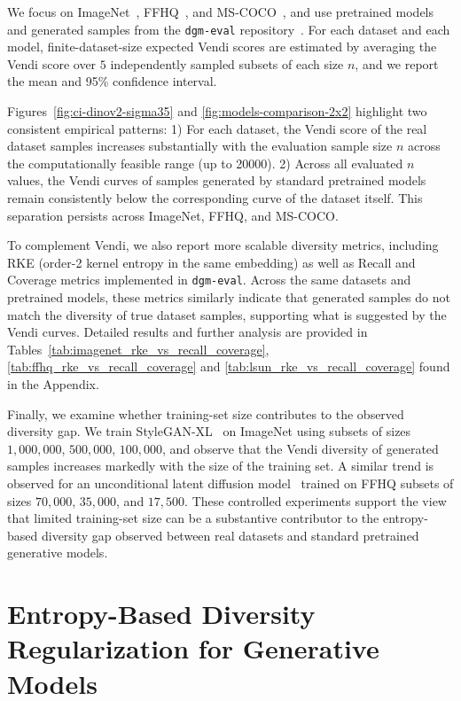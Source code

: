 \documentclass{article}
\theoremstyle{plain}
\theoremstyle{definition}
\begin{document}
We focus on ImageNet~\citep{deng2009imagenet}, FFHQ~\citep{karras2019style}, and MS-COCO~\citep{lin2014coco}, and use pretrained models and generated samples from the \texttt{dgm-eval} repository~\citep{stein_exposing_2023}.
For each dataset and each model, finite-dataset-size expected Vendi scores are estimated by averaging the Vendi score over $5$ independently sampled subsets of each size $n$, and we report the mean and 95\% confidence interval.\vspace{1mm}

Figures~\ref{fig:ci-dinov2-sigma35} and \ref{fig:models-comparison-2x2} highlight two consistent empirical patterns: 1)
For each dataset, the Vendi score of the real dataset samples increases substantially with the evaluation sample size $n$ across the computationally feasible range (up to 20000). 2) Across all evaluated $n$ values, the Vendi curves of samples generated by standard pretrained models remain consistently below the corresponding curve of the dataset itself.
This separation persists across ImageNet, FFHQ, and MS-COCO.

To complement Vendi, we also report more scalable diversity metrics, including RKE (order-2 kernel entropy in the same embedding) as well as Recall and Coverage metrics implemented in \texttt{dgm-eval}.
Across the same datasets and pretrained models, these metrics similarly indicate that generated samples do not match the diversity of true dataset samples, supporting what is suggested by the Vendi curves. Detailed results and further analysis are provided in Tables~\ref{tab:imagenet_rke_vs_recall_coverage}, \ref{tab:ffhq_rke_vs_recall_coverage} and \ref{tab:lsun_rke_vs_recall_coverage} found in the Appendix.

Finally, we examine whether training-set size contributes to the observed diversity gap.
We train StyleGAN-XL~\citep{sauer2022styleganxl} on ImageNet using subsets of sizes $1{,}000{,}000$, $500{,}000$, $100{,}000$, and observe that the Vendi diversity of generated samples increases markedly with the size of the training set.
A similar trend is observed for an unconditional latent diffusion model~\citep{rombach2022ldm} trained on FFHQ subsets of sizes $70{,}000$, $35{,}000$, and $17{,}500$.
These controlled experiments support the view that limited training-set size can be a substantive contributor to the entropy-based diversity gap observed between real datasets and standard pretrained generative models.


\section{Entropy-Based Diversity Regularization for Generative Models}
\label{sec:entropy_regularization}
\end{document}
